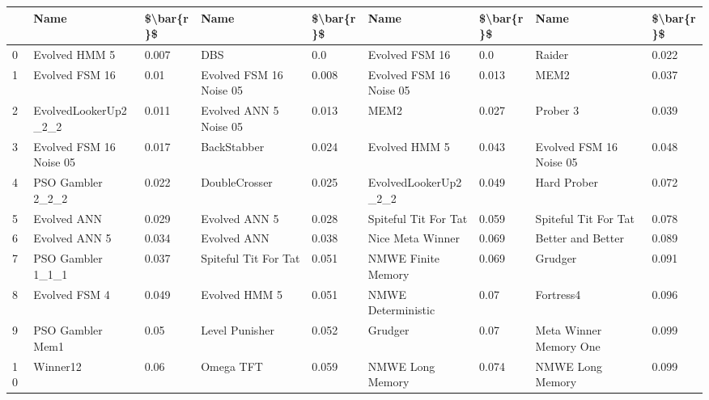 \begin{tabular}{lllllllll}
\toprule
{} &                     Name & \$\textbackslash bar\{r\}\$ &                        Name & \$\textbackslash bar\{r\}\$ &                       Name & \$\textbackslash bar\{r\}\$ &                       Name & \$\textbackslash bar\{r\}\$ \\
\midrule
0  &            Evolved HMM 5 &     0.007 &                         DBS &       0.0 &             Evolved FSM 16 &       0.0 &                     Raider &     0.022 \\
1  &           Evolved FSM 16 &      0.01 &     Evolved FSM 16 Noise 05 &     0.008 &    Evolved FSM 16 Noise 05 &     0.013 &                       MEM2 &     0.037 \\
2  &     EvolvedLookerUp2\_2\_2 &     0.011 &      Evolved ANN 5 Noise 05 &     0.013 &                       MEM2 &     0.027 &                   Prober 3 &     0.039 \\
3  &  Evolved FSM 16 Noise 05 &     0.017 &                 BackStabber &     0.024 &              Evolved HMM 5 &     0.043 &    Evolved FSM 16 Noise 05 &     0.048 \\
4  &        PSO Gambler 2\_2\_2 &     0.022 &               DoubleCrosser &     0.025 &       EvolvedLookerUp2\_2\_2 &     0.049 &                Hard Prober &     0.072 \\
5  &              Evolved ANN &     0.029 &               Evolved ANN 5 &     0.028 &       Spiteful Tit For Tat &     0.059 &       Spiteful Tit For Tat &     0.078 \\
6  &            Evolved ANN 5 &     0.034 &                 Evolved ANN &     0.038 &           Nice Meta Winner &     0.069 &          Better and Better &     0.089 \\
7  &        PSO Gambler 1\_1\_1 &     0.037 &        Spiteful Tit For Tat &     0.051 &         NMWE Finite Memory &     0.069 &                    Grudger &     0.091 \\
8  &            Evolved FSM 4 &     0.049 &               Evolved HMM 5 &     0.051 &         NMWE Deterministic &      0.07 &                  Fortress4 &     0.096 \\
9  &         PSO Gambler Mem1 &      0.05 &              Level Punisher &     0.052 &                    Grudger &      0.07 &     Meta Winner Memory One &     0.099 \\
10 &                 Winner12 &      0.06 &                   Omega TFT &     0.059 &           NMWE Long Memory &     0.074 &           NMWE Long Memory &     0.099 \\

\end{tabular}
